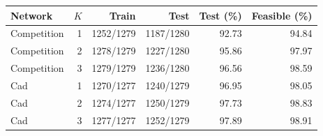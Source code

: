 \begin{tabular}{lrrrrr}\toprule Network & $K$ & Train & Test & Test (\%) & Feasible (\%)\\\midrule
Competition & 1 & 1252/1279 & 1187/1280 & 92.73 & 94.84 \\
Competition & 2 & 1278/1279 & 1227/1280 & 95.86 & 97.97 \\
Competition & 3 & 1279/1279 & 1236/1280 & 96.56 & 98.59 \\
Cad & 1 & 1270/1277 & 1240/1279 & 96.95 & 98.05 \\
Cad & 2 & 1274/1277 & 1250/1279 & 97.73 & 98.83 \\
Cad & 3 & 1277/1277 & 1252/1279 & 97.89 & 98.91 \\
\bottomrule\end{tabular}